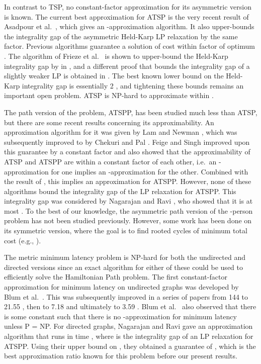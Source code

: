 \documentclass[11pt]{article}
\begin{document}
In contrast to TSP, no constant-factor approximation for its asymmetric version is known. The current best approximation for ATSP is the very recent result of Asadpour et al.\ \cite{asadpour:atsp}, which gives an -approximation algorithm. It also upper-bounds the integrality gap of the asymmetric Held-Karp LP relaxation by the same factor. 
Previous algorithms guarantee a solution of cost within   factor 
of optimum \cite{frieze:galbiati,kleinberg:williamson,kaplan,feige:singh}. The 
algorithm of Frieze et al.\ \cite{frieze:galbiati} is shown to
upper-bound the  Held-Karp integrality gap by  in \cite{williamson:msthesis}, and a different proof that bounds the integrality gap of a slightly weaker LP is obtained in 
\cite{nagarajan:ravi:polylog}. The best known lower bound on the Held-Karp integrality gap is essentially 2 \cite{charikar:goemans:karloff}, and tightening these bounds remains an important open problem. ATSP is NP-hard to approximate 
within  \cite{papadimitriou:vempala}.

The path version of the problem, ATSPP, has been studied much less than ATSP, but there are some recent results concerning its approximability.
An  approximation algorithm for it was given by Lam and 
Newman \cite{lam:newman}, which 
was subsequently improved to  by Chekuri and Pal \cite{chekuri:pal:atspp}. 
Feige and Singh \cite{feige:singh} improved upon this guarantee by a constant factor and also showed that the 
approximability of ATSP and \mbox{ATSPP} are within a constant factor of each other, i.e.\ an -approximation for one implies an -approximation for the other. Combined with the result of \cite{asadpour:atsp}, this implies an  approximation for ATSPP. 
However, none of these algorithms bound the integrality gap of the LP relaxation for ATSPP. This integrality gap was considered by Nagarajan and 
Ravi \cite{nagarajan:ravi:latency}, who showed that it is at most .
To the best of our knowledge, the asymmetric path version of the -person problem has not been studied previously. However, some work has been done on its symmetric version, where the goal is to find  rooted cycles of minimum total cost (e.g., \cite{frieze:kperson}).


The metric minimum latency problem is NP-hard for both the undirected and directed versions since an exact algorithm for either of these could be used to efficiently solve the Hamiltonian Path problem.
The first constant-factor approximation for minimum latency  on undirected graphs was 
developed by Blum et al.\ \cite{blum:chalasani}. This was subsequently improved in 
a series of papers from 144 to 21.55 \cite{goemans:kleinberg}, then to 7.18 \cite{archer:levin:williamson} and ultimately to 3.59 \cite{chaudhuri}. 
Blum et al.\ \cite{blum:chalasani} also observed that
there is some constant  such that there
is no -approximation for  minimum latency unless P = NP.
For directed graphs, Nagarajan and Ravi \cite{nagarajan:ravi:latency}
gave an  approximation algorithm that runs in time ,
where  is the integrality gap of an LP relaxation for ATSPP.
Using their  upper bound on , they 
obtained a guarantee of , which is the best approximation ratio known for this problem before our present results.
\end{document}
